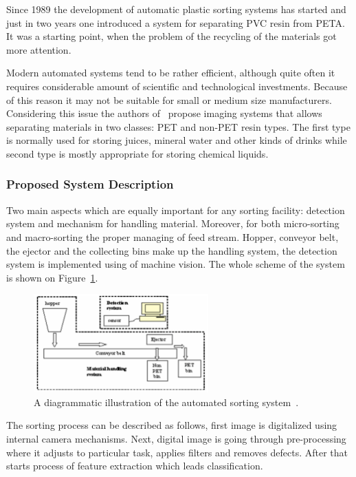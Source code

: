\documentclass{lutmscthesis}[2010/09/22]
\begin{document}
Since 1989 the development of automatic plastic sorting systems
has started and just in two years one introduced a system for separating
PVC resin from PETA. It was a starting point, when the problem
of the recycling of the materials got more attention.

Modern automated systems tend to be rather efficient, although
quite often it requires considerable amount of scientific and
technological investments. Because of this reason it may not
be suitable for small or medium size manufacturers. Considering this
issue the authors of~\cite{Wahab:2006} propose imaging systems
that allows separating materials in two classes: PET and non-PET
resin types. The first type is normally used for storing
juices, mineral water and other kinds of drinks while
second type is mostly appropriate for storing chemical
liquids.

\subsubsection*{ Proposed System Description }
Two main aspects which are equally important for any sorting
facility: detection system and mechanism for handling material.
Moreover, for both micro-sorting and macro-sorting
the proper managing of feed stream. Hopper, conveyor belt, the ejector
and the collecting bins make up the handling system,
the detection system is implemented using of machine vision.
The whole scheme of the system is shown on
Figure~\ref{afig:scheme_plastic}.

\begin{figure}[htp]
  {\par\centering
  \includegraphics[width=0.60\textwidth]{scheme-plastic}
  \par}
  \caption{A diagrammatic illustration of the automated sorting system~\cite{Wahab:2006}.}
  \label{afig:scheme_plastic}
\end{figure}

The sorting process can be described as follows, first
image is digitalized using internal camera mechanisms.
Next, digital image is going through pre-processing
where it adjusts to particular task, applies filters
and removes defects. After that starts process
of feature extraction which leads classification.
\end{document}
